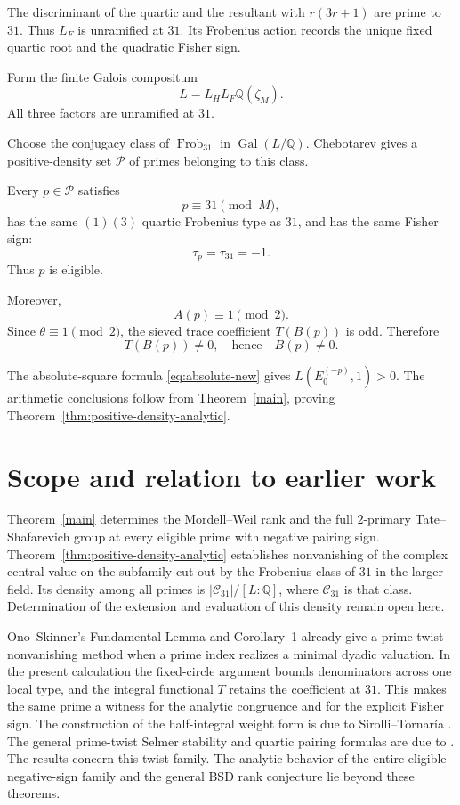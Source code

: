 \documentclass[11pt]{article}
\newcommand{\Q}{\mathbb Q}
\begin{document}
The discriminant of the quartic and
the resultant with $r(3r+1)$ are
prime to $31$. Thus $L_F$ is
unramified at $31$.
Its Frobenius action records the
unique fixed quartic root and the
quadratic Fisher sign.

Form the finite Galois compositum
\[
L=L_HL_F\mathbb Q(\zeta_M).
\]
All three factors are unramified
at $31$.

Choose the conjugacy class of
$\operatorname{Frob}_{31}$ in
$\operatorname{Gal}(L/\mathbb Q)$.
Chebotarev gives a positive-density
set $\mathcal P$ of primes belonging
to this class.

Every $p\in\mathcal P$ satisfies
\[
p\equiv31\pmod M,
\]
has the same $(1)(3)$ quartic
Frobenius type as $31$, and has
the same Fisher sign:
\[
\tau_p=\tau_{31}=-1.
\]
Thus $p$ is eligible.

Moreover,
\[
A(p)\equiv1\pmod2.
\]
Since $\theta\equiv1\pmod2$,
the sieved trace coefficient $T(B(p))$ is
odd. Therefore
\[
T(B(p))\ne0,
\quad\text{hence}\quad B(p)\ne0.
\]

The absolute-square formula \eqref{eq:absolute-new} gives
$L(E_0^{(-p)},1)>0$. The arithmetic conclusions follow from
Theorem~\ref{main}, proving Theorem~\ref{thm:positive-density-analytic}.

\section{Scope and relation to earlier work}

Theorem~\ref{main} determines the Mordell--Weil rank and the full
$2$-primary Tate--Shafarevich group at every eligible prime with
negative pairing sign. Theorem~\ref{thm:positive-density-analytic}
establishes nonvanishing of the complex central value on the
subfamily cut out by the Frobenius class of $31$ in the larger field.
Its density among all primes is $|\mathcal C_{31}|/[L:\Q]$, where
$\mathcal C_{31}$ is that class. Determination of the extension and
evaluation of this density remain open here.

Ono--Skinner's Fundamental Lemma and Corollary~1 \cite{OS} already
give a prime-twist nonvanishing method when a prime index realizes a
minimal dyadic valuation. In the present calculation the
fixed-circle argument bounds denominators across one local type, and
the integral functional $T$ retains the coefficient at $31$. This
makes the same prime a witness for the analytic congruence and for
the explicit Fisher sign. The construction of the half-integral
weight form is due to Sirolli--Tornar\'ia \cite{ST}.
The general prime-twist Selmer stability and quartic pairing formulas
are due to \cite{BPT,Fisher}. The results concern this twist family.
The analytic behavior of the entire eligible negative-sign family and
the general BSD rank conjecture lie beyond these theorems.
\end{document}
